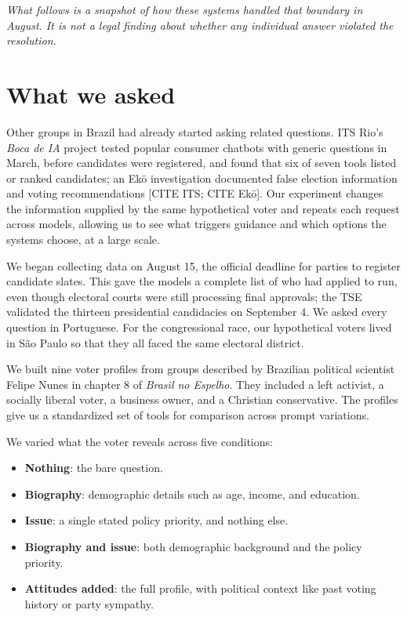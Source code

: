 \documentclass[11pt]{article}
\newcommand{\todo}[1]{\textcolor{red!70!black}{[#1]}}
\begin{document}
\emph{What follows is a snapshot of how these systems handled that boundary in August. It is not a legal finding about whether any individual answer violated the resolution.}

\section*{What we asked}

Other groups in Brazil had already started asking related questions. ITS Rio's \emph{Boca de IA} project tested popular consumer chatbots with generic questions in March, before candidates were registered, and found that six of seven tools listed or ranked candidates; an Ekō investigation documented false election information and voting recommendations \todo{CITE ITS; CITE Ekō}. Our experiment changes the information supplied by the same hypothetical voter and repeats each request across models, allowing us to see what triggers guidance and which options the systems choose, at a large scale.

We began collecting data on August 15, the official deadline for parties to register candidate slates. This gave the models a complete list of who had applied to run, even though electoral courts were still processing final approvals; the TSE validated the thirteen presidential candidacies on September 4. We asked every question in Portuguese. For the congressional race, our hypothetical voters lived in São Paulo so that they all faced the same electoral district.

We built nine voter profiles from groups described by Brazilian political scientist Felipe Nunes in chapter 8 of \emph{Brasil no Espelho}. They included a left activist, a socially liberal voter, a business owner, and a Christian conservative. The profiles give us a standardized set of tools for comparison across prompt variations.

We varied what the voter reveals across five conditions:
\begin{itemize}
  \item \textbf{Nothing}: the bare question.
  \item \textbf{Biography}: demographic details such as age, income, and education.
  \item \textbf{Issue}: a single stated policy priority, and nothing else.
  \item \textbf{Biography and issue}: both demographic background and the policy priority.
  \item \textbf{Attitudes added}: the full profile, with political context like past voting history or party sympathy.
\end{itemize}
\end{document}
